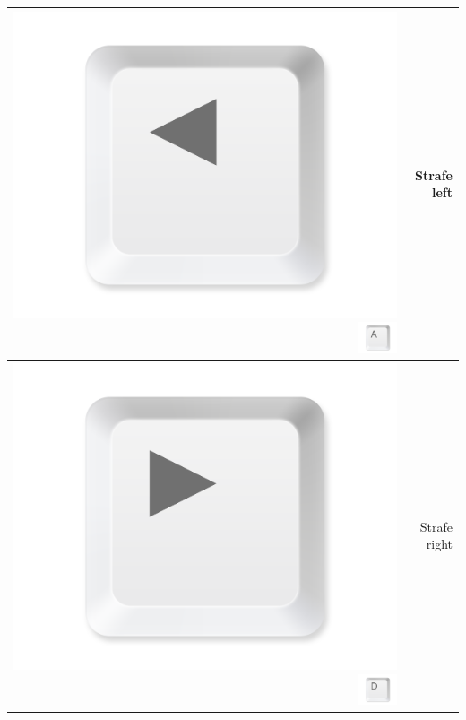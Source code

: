 \documentclass[11pt,a4paper]{report}
\begin{document}
\begin{table}[htbp]
\begin{tabular}{rr}
    \midrule
          \includegraphics[width=\buttonsize\textwidth]{ButtonLeft}\includegraphics[width=0.1\textwidth]{ButtonA} & Strafe left \\
    \midrule
          \includegraphics[width=\buttonsize1\textwidth]{ButtonRight}\includegraphics[width=0.1\textwidth]{ButtonD} & Strafe right \\

\end{tabular}
\end{table}
\end{document}
